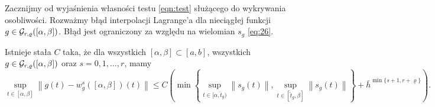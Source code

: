 \documentclass[oik, pdftex, robocza, man]{mgrwms}
\begin{document}
    Zacznijmy od wyjaśnienia własności testu \eqref{eqn:test} służącego do wykrywania osobliwości. Rozważmy błąd interpolacji Lagrange'a dla nieciągłej funkcji $g \in \mathcal{G}_{r,\varrho}([\alpha,\beta])$. Błąd jest ograniczony za względu na wielomian $s_{g}$ \eqref{eq:26}.

    \begin{lemma} \label{lem:1:2014}
        Istnieje stała $C$ taka, że dla wszystkich $[\alpha, \beta] \subset [a, b]$, wszystkich $g \in \mathcal{G}_{r,\varrho}([\alpha,\beta])$ oraz $s=0,1,\dots,r$, mamy
        \begin{equation*}
            \sup _{t \in[\alpha, \beta]}\left\|g(t)-w_{g}^{s}([\alpha, \beta])(t)\right\| \leq 
                C\left(\min \left\{\sup_{t \in[\alpha, \hat{t}_{g})}\left\|s_{g}(t)\right\|, \sup _{t \in [\hat{t}_{g}, \beta]}\left\|s_{g}(t)\right\|\right\}+\bar{h}^{\min \{s+1, r+\varrho\}}\right).
        \end{equation*}
    \end{lemma}
\end{document}
